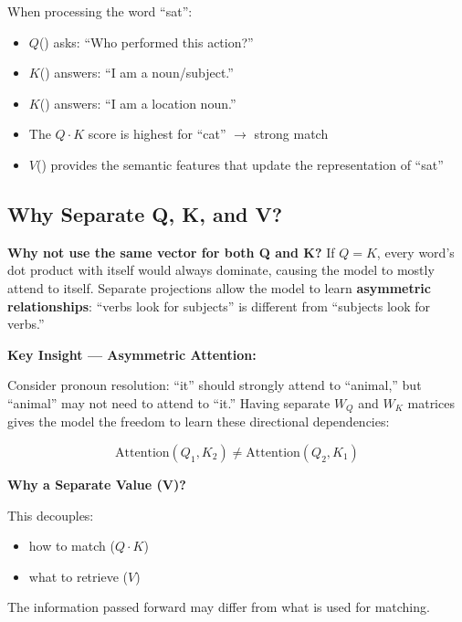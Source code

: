 \documentclass[11pt]{article}
\begin{document}
\begin{examplebox}
When processing the word ``sat'':

\begin{itemize}[nosep]
  \item $Q$() asks: ``Who performed this action?''
  \item $K$() answers: ``I am a noun/subject.''
  \item $K$() answers: ``I am a location noun.''
  \item The $Q \cdot K$ score is highest for ``cat'' $\rightarrow$ strong match
  \item $V$() provides the semantic features that update the representation of ``sat''
\end{itemize}

\end{examplebox}

\subsection{Why Separate Q, K, and V?}

\textbf{Why not use the same vector for both Q and K?} If $Q = K$, every word's dot product with itself would always dominate, causing the model to mostly attend to itself. Separate projections allow the model to learn \textbf{asymmetric relationships}: ``verbs look for subjects'' is different from ``subjects look for verbs.''

\medskip

\noindent\textbf{Key Insight --- Asymmetric Attention:}

Consider pronoun resolution: ``it'' should strongly attend to ``animal,'' but ``animal'' may not need to attend to ``it.'' Having separate $W_Q$ and $W_K$ matrices gives the model the freedom to learn these directional dependencies:

\[
\text{Attention}(Q_1, K_2) \neq \text{Attention}(Q_2, K_1)
\]

\noindent\textbf{Why a Separate Value (V)?}

This decouples:

\begin{itemize}[nosep]
\item how to match ($Q \cdot K$)
\item what to retrieve ($V$)
\end{itemize}

The information passed forward may differ from what is used for matching.
\end{document}
